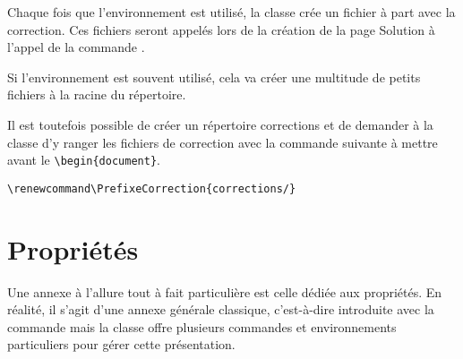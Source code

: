 \documentclass[nocrop]{sesamanuel}
\begin{document}
\renewcommand{\StringDOCUMENTATION}{Organisation pratique}
\begin{documentation}
 Chaque fois que l'environnement  est utilisé, la classe crée un fichier à part avec la correction. Ces fichiers seront appelés lors de la création de la page Solution à l'appel de la commande . 
 
 Si l'environnement est souvent utilisé, cela va créer une multitude de petits fichiers à la racine du répertoire. 
 
 Il est toutefois possible de créer un répertoire \og corrections \fg{} et de demander à la classe d'y ranger les fichiers de correction avec la commande suivante 
 à mettre avant le \verb+\begin{document}+.
 
 
\end{documentation}

\begin{syntaxe}
 \verb+\renewcommand\PrefixeCorrection{corrections/}+
\end{syntaxe}


\vfill \clearpage
\section{Propriétés}
\label{sec-proprietes}
Une annexe à l'allure tout à fait particulière est celle dédiée aux
propriétés. En réalité, il s'agit d'une annexe générale classique,
c'est-à-dire introduite avec la commande  mais la classe
offre plusieurs commandes et environnements particuliers pour gérer
cette présentation.
\end{document}
